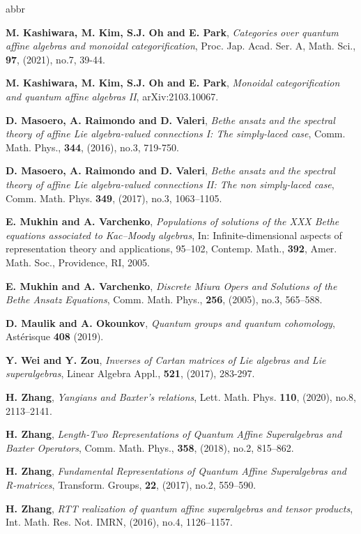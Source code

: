 \documentclass[11pt]{amsart}
\theoremstyle{definition}
\theoremstyle{remark}
\numberwithin{equation}{section}
\begin{document}
\begin{thebibliography}{abbr}
{ {\bf M. Kashiwara, M. Kim, S.J. Oh and E. Park}, {\it Categories over quantum affine algebras and monoidal categorification}, Proc. Jap. Acad. Ser. A, Math. Sci., \textbf{97}, (2021), no.7, 39-44.

 {\bf M. Kashiwara, M. Kim, S.J. Oh and E. Park}, {\it Monoidal categorification and quantum affine algebras {II}}, arXiv:2103.10067.

 {\bf D. Masoero, A. Raimondo and D. Valeri}, {\it Bethe ansatz and the spectral theory of affine Lie algebra-valued connections I: The simply-laced case}, Comm. Math. Phys., \textbf{344}, (2016), no.3, 719-750.

 {\bf D. Masoero, A. Raimondo and D. Valeri}, {\it Bethe ansatz and the spectral theory of affine Lie algebra-valued connections II: The non simply-laced case}, Comm. Math. Phys. \textbf{349}, (2017), no.3, 1063–1105.

 {\bf E. Mukhin and A. Varchenko}, {\it Populations of solutions of the XXX Bethe equations associated to
Kac–Moody algebras}, In: Infinite-dimensional aspects of representation theory and applications, 95–102, Contemp. Math., \textbf{392}, Amer. Math. Soc., Providence, RI, 2005.

 {\bf E. Mukhin and A. Varchenko}, {\it Discrete Miura Opers and Solutions of the Bethe Ansatz Equations}, Comm. Math. Phys., \textbf{256}, (2005), no.3, 565–588.

 {\bf D. Maulik and A. Okounkov}, {\it Quantum groups and quantum cohomology}, Astérisque \textbf{408} (2019).


 {\bf Y. Wei and Y. Zou}, {\it Inverses of Cartan matrices of Lie algebras and Lie superalgebras}, Linear Algebra Appl., \textbf{521}, (2017), 283-297.

 {\bf H. Zhang}, {\it Yangians and Baxter’s relations}, Lett. Math. Phys. \textbf{110}, (2020), no.8, 2113–2141.}

 {\bf H. Zhang}, {\it Length-Two Representations of Quantum Affine Superalgebras and Baxter Operators}, Comm. Math. Phys., \textbf{358}, (2018), no.2, 815–862.

 {\bf H. Zhang}, {\it Fundamental Representations of Quantum Affine Superalgebras and R-matrices}, Transform. Groups, \textbf{22}, (2017), no.2, 559–590.

 {\bf H. Zhang}, {\it RTT realization of quantum affine superalgebras and tensor products}, Int. Math. Res. Not. IMRN, (2016), no.4, 1126–1157.

\end{thebibliography}

 \let\addcontentsline\oldaddcontentsline
\end{document}
